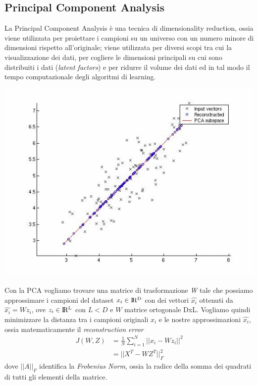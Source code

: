 \documentclass[a4paper,8pt]{article}
\newenvironment{Figure}
  {\par\medskip\noindent\minipage{\linewidth}}
  {\endminipage\par\medskip}
\begin{document}
\begin{multicols}{2}
\section{Principal Component Analysis}
La Principal Component Analysis è una tecnica di dimensionality reduction, ossia viene utilizzata per proiettare i campioni su un universo con un numero minore di dimensioni rispetto all'originale; viene utilizzata per diversi scopi tra cui la visualizzazione dei dati, per cogliere le dimensioni principali su cui sono distribuiti i dati (\emph{latent factors}) e per ridurre il volume dei dati ed in tal modo il tempo computazionale degli algoritmi di learning.
\begin{Figure}
 \centering
 \includegraphics[width=\linewidth]{pca}
\end{Figure}
Con la PCA vogliamo trovare una matrice di trasformazione \emph{W} tale che possiamo approssimare i campioni del dataset $x_i \in \rm I\!R^D$ con dei vettori $\hat{x_i}$ ottenuti da $\hat{x_i} = Wz_i$, ove $z_i \in \rm I\!R^L$ con $L<D$ e $W$ matrice ortogonale DxL. Vogliamo quindi minimizzare la distanza tra i campioni originali $x_i$ e le nostre approssimazioni $\hat{x_i}$, ossia matematicamente il \emph{reconstruction error}
\begin{equation}
\begin{split}
J(W,Z) &= \frac{1}{N}\sum_{i=1}^{N}|| x_i - Wz_i||^2\\
&= ||X^T - WZ^T||^2_F
\end{split}
\end{equation} 
dove $||A||_F$ identifica la \emph{Frobenius Norm}, ossia la radice della somma dei quadrati di tutti gli elementi della matrice.\\

\end{multicols}
\end{document}
